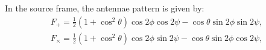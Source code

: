 \documentclass{ttuthes2007}
\begin{document}
In the source frame, the antennae pattern is given by:
\begin{align}
F_+=\frac{1}{2}(1+\cos^2\theta)\cos2\phi\cos2\psi-\cos\theta\sin2\phi\sin2\psi,\\
F_\times=\frac{1}{2}(1+\cos^2\theta)\cos2\phi\sin2\psi-\cos\theta\sin2\phi\cos2\psi,
\end{align}
\end{document}
